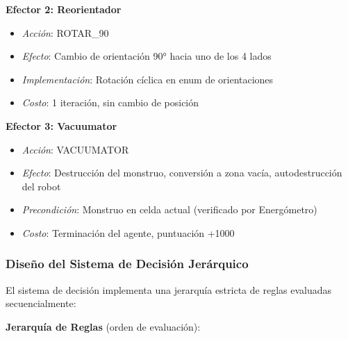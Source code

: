 \documentclass[10pt,twocolumn]{article}
\begin{document}
\textbf{Efector 2: Reorientador}
\begin{itemize}
\item \textit{Acción}: ROTAR\_90
\item \textit{Efecto}: Cambio de orientación 90° hacia uno de los 4 lados
\item \textit{Implementación}: Rotación cíclica en enum de orientaciones
\item \textit{Costo}: 1 iteración, sin cambio de posición
\end{itemize}

\textbf{Efector 3: Vacuumator}
\begin{itemize}
\item \textit{Acción}: VACUUMATOR
\item \textit{Efecto}: Destrucción del monstruo, conversión a zona vacía, autodestrucción del robot
\item \textit{Precondición}: Monstruo en celda actual (verificado por Energómetro)
\item \textit{Costo}: Terminación del agente, puntuación +1000
\end{itemize}

\subsubsection{Diseño del Sistema de Decisión Jerárquico}

El sistema de decisión implementa una jerarquía estricta de reglas evaluadas secuencialmente:

\textbf{Jerarquía de Reglas} (orden de evaluación):
\end{document}
